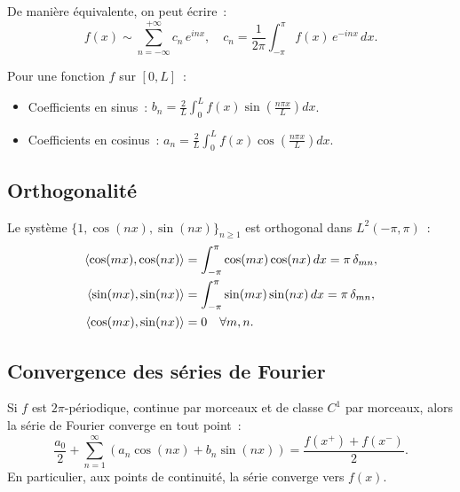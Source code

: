 \begin{definition}
De mani\`ere \'equivalente, on peut \'ecrire~:
\[
    f(x) \sim \sum_{n=-\infty}^{+\infty} c_n\, e^{inx}, \quad
    c_n = \frac{1}{2\pi}\int_{-\pi}^{\pi} f(x)\, e^{-inx}\, dx.
\]
\end{definition}

\begin{formules}[title=\textbf{Coefficients de Fourier sur $[0,L]$}]
Pour une fonction $f$ sur $[0,L]$~:
\begin{itemize}
    \item Coefficients en sinus~: $b_n = \frac{2}{L}\int_0^L f(x)\sin\!\left(\frac{n\pi x}{L}\right) dx$.
    \item Coefficients en cosinus~: $a_n = \frac{2}{L}\int_0^L f(x)\cos\!\left(\frac{n\pi x}{L}\right) dx$.
\end{itemize}
\end{formules}

\subsection{Orthogonalit\'e}

\begin{proposition}
Le syst\`eme $\{1, \cos(nx), \sin(nx)\}_{n \geq 1}$ est orthogonal dans
$L^2(-\pi, \pi)$~:
\begin{align*}
    \langle \cos(mx), \cos(nx) \rangle &= \int_{-\pi}^{\pi} \cos(mx)\cos(nx)\, dx
    = \pi\, \delta_{mn}, \\
    \langle \sin(mx), \sin(nx) \rangle &= \int_{-\pi}^{\pi} \sin(mx)\sin(nx)\, dx
    = \pi\, \delta_{mn}, \\
    \langle \cos(mx), \sin(nx) \rangle &= 0 \quad \forall m, n.
\end{align*}
\end{proposition}

\subsection{Convergence des s\'eries de Fourier}

\begin{theoreme}
Si $f$ est $2\pi$-p\'eriodique, continue par morceaux et de classe $C^1$
par morceaux, alors la s\'erie de Fourier converge en tout point~:
\[
    \frac{a_0}{2} + \sum_{n=1}^{\infty} (a_n \cos(nx) + b_n \sin(nx))
    = \frac{f(x^+) + f(x^-)}{2}.
\]
En particulier, aux points de continuit\'e, la s\'erie converge vers $f(x)$.
\end{theoreme}

